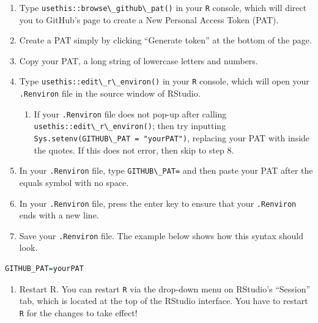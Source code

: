 \documentclass[
  12pt, krantz2,
]{krantz}
\newcommand{\passthrough}[1]{#1}
\providecommand{\tightlist}{%
  \setlength{\itemsep}{0pt}\setlength{\parskip}{0pt}}
\newcommand{\1}{\mathbbm{1}}
\theoremstyle{definition}
\theoremstyle{definition}
\theoremstyle{definition}
\theoremstyle{definition}
\theoremstyle{remark}
\begin{document}
\begin{enumerate}
\def\labelenumi{\arabic{enumi}.}
\item
  Type \passthrough{\lstinline!usethis::browse\_github\_pat()!} in your \passthrough{\lstinline!R!} console, which will direct
  you to GitHub's page to create a New Personal Access Token (PAT).
\item
  Create a PAT simply by clicking ``Generate token'' at the bottom of the page.
\item
  Copy your PAT, a long string of lowercase letters and numbers.
\item
  Type \passthrough{\lstinline!usethis::edit\_r\_environ()!} in your \passthrough{\lstinline!R!} console, which will open your
  \passthrough{\lstinline!.Renviron!} file in the source window of RStudio.

  \begin{enumerate}
  \def\labelenumii{\alph{enumii}.}
  \tightlist
  \item
    If your \passthrough{\lstinline!.Renviron!} file does not pop-up after calling
    \passthrough{\lstinline!usethis::edit\_r\_environ()!}; then try inputting
    \passthrough{\lstinline!Sys.setenv(GITHUB\_PAT = "yourPAT")!}, replacing your PAT with inside the
    quotes. If this does not error, then skip to step 8.
  \end{enumerate}
\item
  In your \passthrough{\lstinline!.Renviron!} file, type \passthrough{\lstinline!GITHUB\_PAT=!} and then paste your PAT after
  the equals symbol with no space.
\item
  In your \passthrough{\lstinline!.Renviron!} file, press the enter key to ensure that your \passthrough{\lstinline!.Renviron!}
  ends with a new line.
\item
  Save your \passthrough{\lstinline!.Renviron!} file. The example below shows how this syntax should
  look.
\end{enumerate}

\begin{lstlisting}[language=R]
GITHUB_PAT=yourPAT
\end{lstlisting}

\begin{enumerate}
\def\labelenumi{\arabic{enumi}.}
\setcounter{enumi}{7}
\tightlist
\item
  Restart R. You can restart \passthrough{\lstinline!R!} via the drop-down menu on RStudio's ``Session''
  tab, which is located at the top of the RStudio interface. You have to
  restart \passthrough{\lstinline!R!} for the changes to take effect!
\end{enumerate}
\end{document}
